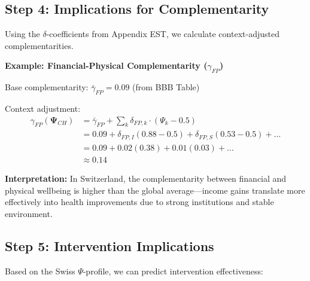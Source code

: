 \subsection{Step 4: Implications for Complementarity}

Using the $\delta$-coefficients from Appendix EST, we calculate context-adjusted 
complementarities.

\textbf{Example: Financial-Physical Complementarity ($\gamma_{FP}$)}

Base complementarity: $\bar{\gamma}_{FP} = 0.09$ (from BBB Table)

Context adjustment:
\begin{align*}
\gamma_{FP}(\boldsymbol{\Psi}_{CH}) &= \bar{\gamma}_{FP} + \sum_k \delta_{FP,k} \cdot (\Psi_k - 0.5) \\
&= 0.09 + \delta_{FP,I}(0.88-0.5) + \delta_{FP,S}(0.53-0.5) + \ldots \\
&= 0.09 + 0.02(0.38) + 0.01(0.03) + \ldots \\
&\approx 0.14
\end{align*}

\textbf{Interpretation:} In Switzerland, the complementarity between financial 
and physical wellbeing is higher than the global average---income gains 
translate more effectively into health improvements due to strong institutions 
and stable environment.

\subsection{Step 5: Intervention Implications}

Based on the Swiss $\Psi$-profile, we can predict intervention effectiveness:

